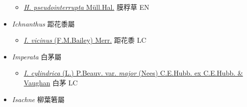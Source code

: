 \begin{itemize}
  \begin{itemize}
        \item[] \href{http://www.theplantlist.org/tpl1.1/search?q=Hymenachne+pseudointerrupta}{\textit{H. pseudointerrupta} Müll.Hal.}   膜稃草 EN
  \end{itemize}
 \item[] \textit{Ichnanthus} 距花黍屬
                    
  \begin{itemize}
        \item[] \href{http://www.theplantlist.org/tpl1.1/search?q=Ichnanthus+vicinus}{\textit{I. vicinus} (F.M.Bailey) Merr.}   距花黍 LC
  \end{itemize}
 \item[] \textit{Imperata} 白茅屬
                    
  \begin{itemize}
        \item[] \href{http://www.theplantlist.org/tpl1.1/search?q=Imperata+cylindrica+var.+major}{\textit{I. cylindrica} (L.) P.Beauv. var. \textit{major} (Nees) C.E.Hubb. ex C.E.Hubb. \& Vaughan}   白茅 LC
  \end{itemize}
 \item[] \textit{Isachne} 柳葉箬屬
                    

\end{itemize}
